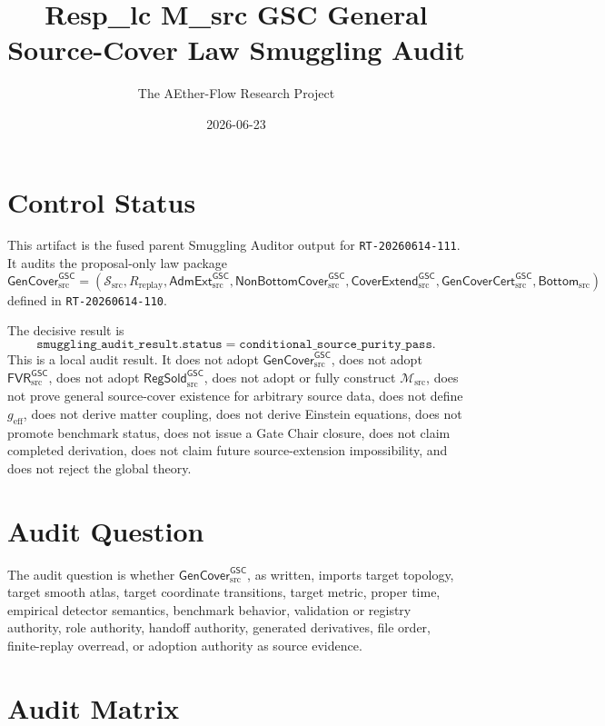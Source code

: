 \documentclass[11pt]{article}
\title{Resp\_lc M\_src GSC General Source-Cover Law Smuggling Audit}
\author{The AEther-Flow Research Project}
\date{2026-06-23}
\newcommand{\Msrc}{\mathcal{M}_{\mathrm{src}}}
\newcommand{\geff}{g_{\mathrm{eff}}}
\newcommand{\RegSold}{\mathsf{RegSold}_{\mathrm{src}}^{\mathsf{GSC}}}
\newcommand{\FVRSrc}{\mathsf{FVR}_{\mathrm{src}}^{\mathsf{GSC}}}
\newcommand{\GenCover}{\mathsf{GenCover}_{\mathrm{src}}^{\mathsf{GSC}}}
\newcommand{\AdmExt}{\mathsf{AdmExt}_{\mathrm{src}}^{\mathsf{GSC}}}
\newcommand{\CoverExt}{\mathsf{CoverExtend}_{\mathrm{src}}^{\mathsf{GSC}}}
\newcommand{\NonBottom}{\mathsf{NonBottomCover}_{\mathrm{src}}^{\mathsf{GSC}}}
\newcommand{\Cert}{\mathsf{GenCoverCert}_{\mathrm{src}}^{\mathsf{GSC}}}
\newcommand{\BottomSrc}{\mathsf{Bottom}_{\mathrm{src}}}
\begin{document}
\maketitle

\section*{Control Status}

This artifact is the fused parent Smuggling Auditor output for
\texttt{RT-20260614-111}. It audits the proposal-only law package
\[
  \GenCover =
  (
    \mathcal{S}_{\mathrm{src}},
    R_{\mathrm{replay}},
    \AdmExt,
    \NonBottom,
    \CoverExt,
    \Cert,
    \BottomSrc
  )
\]
defined in \texttt{RT-20260614-110}.

The decisive result is
\[
  \texttt{smuggling\_audit\_result.status}
  =
  \texttt{conditional\_source\_purity\_pass}.
\]
This is a local audit result. It does not adopt \(\GenCover\), does not adopt
\(\FVRSrc\), does not adopt \(\RegSold\), does not adopt or fully construct
\(\Msrc\), does not prove general source-cover existence for arbitrary source
data, does not define \(\geff\), does not derive matter coupling, does not
derive Einstein equations, does not promote benchmark status, does not issue a
Gate Chair closure, does not claim completed derivation, does not claim future
source-extension impossibility, and does not reject the global theory.

\section{Audit Question}

The audit question is whether \(\GenCover\), as written, imports target
topology, target smooth atlas, target coordinate transitions, target metric,
proper time, empirical detector semantics, benchmark behavior, validation or
registry authority, role authority, handoff authority, generated derivatives,
file order, finite-replay overread, or adoption authority as source evidence.

\section{Audit Matrix}
\end{document}

